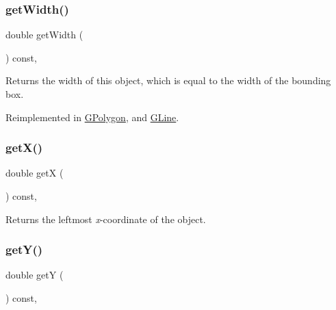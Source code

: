 \subsubsection{\texorpdfstring{get\+Width()}{getWidth()}}
{\footnotesize\ttfamily double get\+Width (\begin{DoxyParamCaption}{ }\end{DoxyParamCaption}) const\hspace{0.3cm}{\ttfamily [virtual]}, {\ttfamily [inherited]}}



Returns the width of this object, which is equal to the width of the bounding box. 



Reimplemented in \mbox{\hyperlink{classsgl_1_1GPolygon_ab7b172cec7ed45e1246a3ce3160a62f7}{G\+Polygon}}, and \mbox{\hyperlink{classsgl_1_1GLine_ab7b172cec7ed45e1246a3ce3160a62f7}{G\+Line}}.

\mbox{\label{classsgl_1_1GObject_a344385751bee0720059403940d57a13e}} 
\subsubsection{\texorpdfstring{get\+X()}{getX()}}
{\footnotesize\ttfamily double getX (\begin{DoxyParamCaption}{ }\end{DoxyParamCaption}) const\hspace{0.3cm}{\ttfamily [virtual]}, {\ttfamily [inherited]}}



Returns the leftmost {\itshape x}-\/coordinate of the object. 

\mbox{\label{classsgl_1_1GObject_aafa51c7f8f38a09febbb9ce7853f77b4}} 
\subsubsection{\texorpdfstring{get\+Y()}{getY()}}
{\footnotesize\ttfamily double getY (\begin{DoxyParamCaption}{ }\end{DoxyParamCaption}) const\hspace{0.3cm}{\ttfamily [virtual]}, {\ttfamily [inherited]}}



